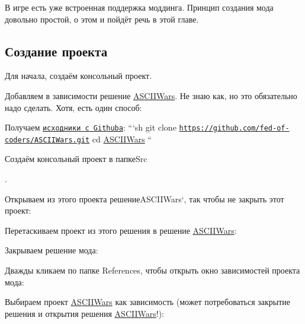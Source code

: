 В игре есть уже встроенная поддержка моддинга. Принцип создания мода довольно простой, о этом и пойдёт речь в этой главе.

\subsection*{Создание проекта}


\begin{DoxyEnumerate}
\item Для начала, создаём консольный проект.
\item Добавляем в зависимости решение {\ttfamily \hyperlink{namespace_a_s_c_i_i_wars}{A\+S\+C\+I\+I\+Wars}}. Не знаю как, но это обязательно надо сделать. Хотя, есть один способ\+:
\begin{DoxyEnumerate}
\item Получаем \href{https://github.com/fed-of-coders/ASCIIWars}{\tt исходники с Github\textquotesingle{}а}\+: ```sh git clone \href{https://github.com/fed-of-coders/ASCIIWars.git}{\tt https\+://github.\+com/fed-\/of-\/coders/\+A\+S\+C\+I\+I\+Wars.\+git} cd \hyperlink{namespace_a_s_c_i_i_wars}{A\+S\+C\+I\+I\+Wars} ``{\ttfamily }
\end{DoxyEnumerate}
\end{DoxyEnumerate}

{\ttfamily Создаём консольный проект в папке}Src{\ttfamily .
\begin{DoxyEnumerate}
\item Открываем из этого проекта решениеA\+S\+C\+I\+I\+Wars`, так чтобы не закрыть этот проект\+: 
\end{DoxyEnumerate}
\begin{DoxyEnumerate}
\item Перетаскиваем проект из этого решения в решение {\ttfamily \hyperlink{namespace_a_s_c_i_i_wars}{A\+S\+C\+I\+I\+Wars}}\+: 
\item Закрываем решение мода\+: 
\item Дважды кликаем по папке {\ttfamily References}, чтобы открыть окно зависимостей проекта мода\+: 
\item Выбираем проект {\ttfamily \hyperlink{namespace_a_s_c_i_i_wars}{A\+S\+C\+I\+I\+Wars}} как зависимость (может потребоваться закрытие решения и открытия решения {\ttfamily \hyperlink{namespace_a_s_c_i_i_wars}{A\+S\+C\+I\+I\+Wars}}!)\+: 
\end{DoxyEnumerate}}

